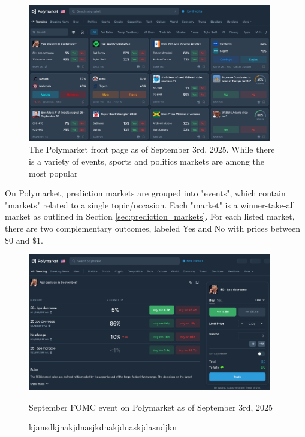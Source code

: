 \begin{figure}[H]
  \begin{center}
    \includegraphics[width=0.95\textwidth]{figures/Polymarket_front_page.png}
  \end{center}
  \caption{The Polymarket front page as of September 3rd, 2025. While there is a variety of events, sports and politics markets are among the most popular}
\end{figure}


On Polymarket, prediction markets are grouped into "events", which contain "markets" related to a single topic/occasion.
Each "market" is a winner-take-all market as outlined in Section \ref{sec:prediction_markets}. For each listed market, there are two complementary outcomes, labeled Yes and No with prices between \$0 and \$1.





\begin{figure}[H]
  \begin{center}
    \includegraphics[width=0.95\textwidth]{figures/FOMC_event_September.png}
  \end{center}
  \caption{September FOMC event on Polymarket as of September 3rd, 2025}
  \caption*{kjansdkjnakjdnasjkdnakjdnaskjdasndjkn}
\end{figure}



